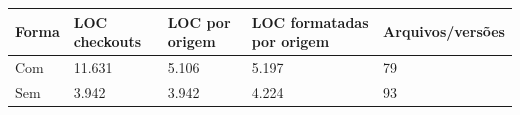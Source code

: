 \begin{tabular}{lllll}
\hline
Forma & LOC checkouts & LOC por origem & LOC formatadas por origem & Arquivos/versões \\
\hline
Com & 11.631 & 5.106 & 5.197 & 79 \\
Sem & 3.942 & 3.942 & 4.224 & 93 \\
\hline
\end{tabular}
